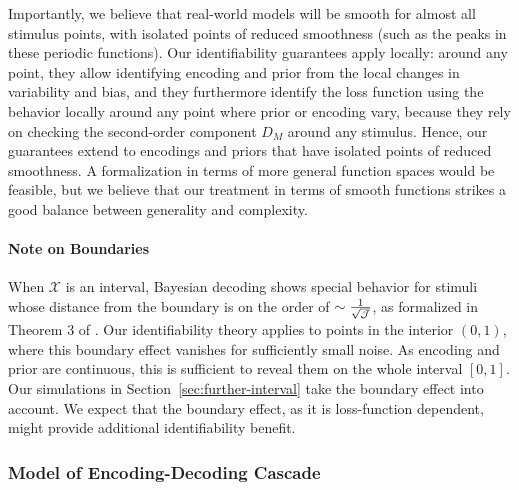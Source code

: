 Importantly, we believe that real-world models will be smooth for almost all stimulus points, with isolated points of reduced smoothness (such as the peaks in these periodic functions). Our identifiability guarantees apply locally: around any point, they allow identifying encoding and prior from the local changes in variability and bias, and they furthermore identify the loss function using the behavior locally around any point where prior or encoding vary, because they rely on checking the second-order component $D_M$ around any stimulus. Hence, our guarantees extend to encodings and priors that have isolated points of reduced smoothness.
A formalization in terms of more general function spaces would be feasible, but we believe that our treatment in terms of smooth functions strikes a good balance between generality and complexity. 

\paragraph*{Note on Boundaries}
When $\mathcal{X}$ is an interval, Bayesian decoding shows special behavior for stimuli whose distance from the boundary is on the order of $\sim \frac{1}{\sqrt{\mathcal{J}}}$, as formalized in Theorem 3 of \citet{hahn2024unifying}. Our identifiability theory applies to points in the interior $(0,1)$, where this boundary effect vanishes for sufficiently small noise. As encoding and prior are continuous, this is sufficient to reveal them on the whole interval $[0,1]$.
Our simulations in Section~\ref{sec:further-interval} take the boundary effect into account.
We expect that the boundary effect, as it is loss-function dependent, might provide additional identifiability benefit. 


\subsubsection{Model of Encoding-Decoding Cascade}

